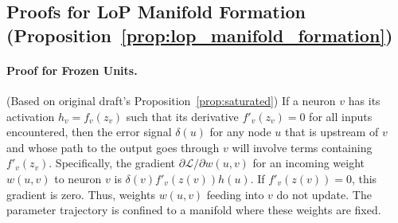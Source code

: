 \documentclass{article}
\newcommand{\Loss}{\mathcal{L}}
\begin{document}
\subsection{Proofs for LoP Manifold Formation (Proposition~\ref{prop:lop_manifold_formation})}
\label{app:proofs_main}

\paragraph{Proof for Frozen Units.}
(Based on original draft's Proposition~\ref{prop:saturated})
If a neuron $v$ has its activation $h_v = f_v(z_v)$ such that its derivative $f'_v(z_v)=0$ for all inputs encountered, then the error signal $\delta(u)$ for any node $u$ that is upstream of $v$ and whose path to the output goes through $v$ will involve terms containing $f'_v(z_v)$. Specifically, the gradient $\partial\Loss/\partial w(u,v)$ for an incoming weight $w(u,v)$ to neuron $v$ is $\delta(v) f'_v(z(v)) h(u)$. If $f'_v(z(v))=0$, this gradient is zero. Thus, weights $w(u,v)$ feeding into $v$ do not update. The parameter trajectory is confined to a manifold where these weights are fixed.
\end{document}
